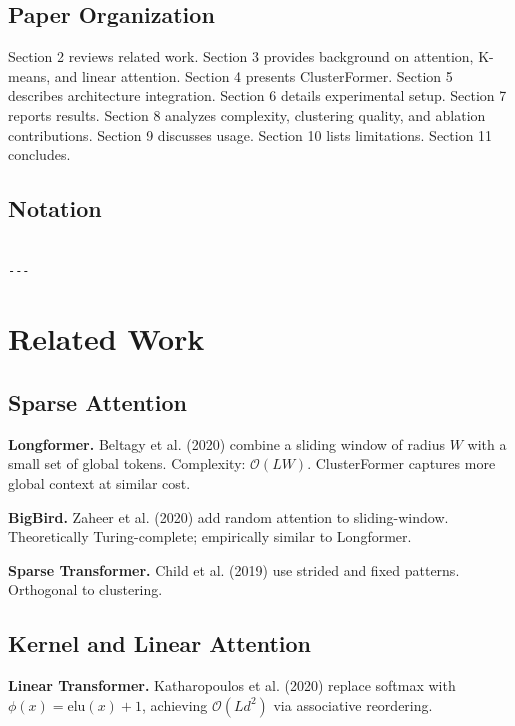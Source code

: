 \subsection{Paper Organization}

Section 2 reviews related work. Section 3 provides background on attention, 
K-means, and linear attention. Section 4 presents ClusterFormer. Section 5 
describes architecture integration. Section 6 details experimental setup. 
Section 7 reports results. Section 8 analyzes complexity, clustering quality, 
and ablation contributions. Section 9 discusses usage. Section 10 lists 
limitations. Section 11 concludes.



\subsection{Notation}

\begin{lstlisting}

---
\end{lstlisting}

\section{Related Work}

\subsection{Sparse Attention}

\textbf{Longformer.} Beltagy et al. (2020) combine a sliding window of radius 
$W$ with a small set of global tokens. Complexity: $\mathcal{O}(L W)$. 
ClusterFormer captures more global context at similar cost.

\textbf{BigBird.} Zaheer et al. (2020) add random attention to sliding-window. 
Theoretically Turing-complete; empirically similar to Longformer.

\textbf{Sparse Transformer.} Child et al. (2019) use strided and fixed patterns. 
Orthogonal to clustering.

\subsection{Kernel and Linear Attention}

\textbf{Linear Transformer.} Katharopoulos et al. (2020) replace softmax with 
$\phi(x) = \text{elu}(x) + 1$, achieving $\mathcal{O}(L d^2)$ via 
associative reordering.


